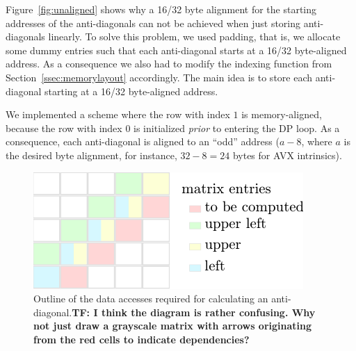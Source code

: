 \documentclass[runningheads,a4paper]{llncs}
\begin{document}
Figure~\ref{fig:unaligned} shows why a 16/32 byte alignment for the starting addresses of the anti-diagonals can not be achieved when just 
storing anti-diagonals linearly. To solve this problem, we used padding, that is, we allocate some dummy entries such that 
each anti-diagonal starts at a 16/32 byte-aligned address.
As a consequence we also had to modify the indexing function from Section~\ref{ssec:memorylayout} accordingly. 
The main idea is to store each anti-diagonal starting at a 16/32 byte-aligned address.  



We implemented a scheme where the row with index $1$ is memory-aligned, because the row with index $0$ is initialized {\em prior} to entering the DP loop. 
As a consequence, each anti-diagonal is aligned to an ``odd'' address ($a - 8$, where $a$ is the desired byte alignment, for instance, $32 - 8 = 24$ bytes for AVX intrinsics). 


\begin{figure}[ht!]
  \centering
  \includegraphics[scale=1.1]{figures/alignment.pdf} \caption{Outline of the
  data accesses required for calculating an anti-diagonal.\textbf{TF: I think
  the diagram is rather confusing. Why not just draw a grayscale matrix with
  arrows originating from the red cells to indicate dependencies? }}
  \label{fig:alignment}
\end{figure}
\end{document}

